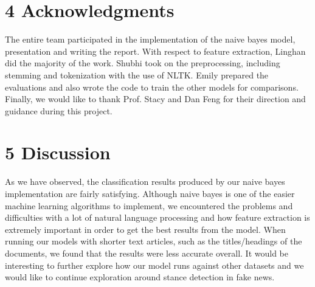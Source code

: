 \documentclass{neu_handout}
\begin{document}
\begin{figure}[h]
\centering
{}
\end{figure}


\section*{4 Acknowledgments}

The entire team participated in the implementation of the naive bayes model, presentation and writing the report. With respect to feature extraction, Linghan did the majority of the work. Shubhi took on the preprocessing, including stemming and tokenization with the use of NLTK. Emily prepared the evaluations and also wrote the code to train the other models for comparisons. Finally, we would like to thank Prof. Stacy and Dan Feng for their direction and guidance during this project.

\section*{5 Discussion}
As we have observed, the classification results produced by our naive bayes implementation are fairly satisfying. Although naive bayes is one of the easier machine learning algorithms to implement, we encountered the problems and difficulties with a lot of natural language processing and how feature extraction is extremely important in order to get the best results from the model. When running our models with shorter text articles, such as the titles/headings of the documents, we found that the results were less accurate overall. It would be interesting to further explore how our model runs against other datasets and we would like to continue exploration around stance detection in fake news.\\
\end{document}

